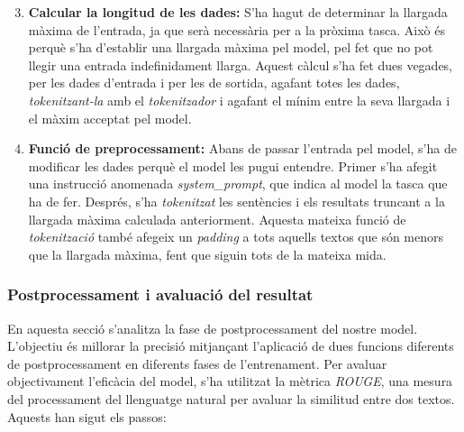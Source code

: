 \begin{enumerate}
    \setcounter{enumi}{2}
    \item \textbf{Calcular la longitud de les dades:} S'ha hagut de determinar la llargada màxima de l'entrada, ja que serà necessària per a la pròxima tasca. Això és perquè s'ha d'establir una llargada màxima pel model, pel fet que no pot llegir una entrada indefinidament llarga. Aquest càlcul s'ha fet dues vegades, per les dades d'entrada i per les de sortida, agafant totes les dades, \textit{tokenitzant-la} amb el \textit{tokenitzador} i agafant el mínim entre la seva llargada i el màxim acceptat pel model.
    \item \textbf{Funció de preprocessament:} Abans de passar l'entrada pel model, s'ha de modificar les dades perquè el model les pugui entendre. Primer s'ha afegit una instrucció anomenada \textit{system\_prompt}, que indica al model la tasca que ha de fer. Després, s'ha \textit{tokenitzat} les sentències i els resultats truncant a la llargada màxima calculada anteriorment. Aquesta mateixa funció de \textit{tokenització} també afegeix un \textit{padding} a tots aquells textos que són menors que la llargada màxima, fent que siguin tots de la mateixa mida.
\end{enumerate}


\subsubsection{Postprocessament i avaluació del resultat}
En aquesta secció s'analitza la fase de postprocessament del nostre model. L'objectiu és millorar la precisió mitjançant l'aplicació de dues funcions diferents de postprocessament en diferents fases de l'entrenament. Per avaluar objectivament l'eficàcia del model, s'ha utilitzat la mètrica \textit{ROUGE}, una mesura del processament del llenguatge natural per avaluar la similitud entre dos textos. Aquests han sigut els passos:

